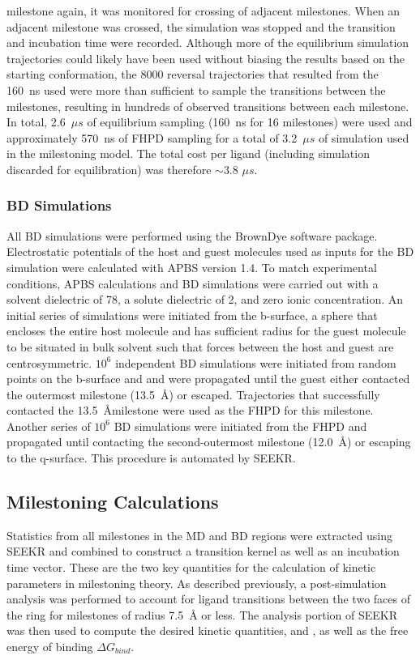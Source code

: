 milestone again, it was monitored for crossing of adjacent milestones.
When an adjacent milestone was crossed, the simulation was stopped and the
transition and incubation time were recorded. Although more of the equilibrium
simulation trajectories could likely have been used without biasing the results
based on the starting conformation, the 8000 reversal trajectories that resulted
from the 160~ns used were more than sufficient to sample the transitions between
the milestones, resulting in hundreds of observed transitions between each milestone.
In total, 2.6~${\mu}s$ of equilibrium sampling (160~ns for 16 milestones) were
used and approximately 570~ns of FHPD sampling for a total of 3.2~${\mu}s$ of
simulation used in the milestoning model. The total cost per ligand (including
simulation discarded for equilibration) was therefore $\sim$3.8 ${\mu}s$.

\subsubsection*{BD Simulations}
\par All BD simulations were performed using the BrownDye software package\cite{Huber2010}.
Electrostatic potentials of the host and guest molecules used as inputs for the
BD simulation were calculated with APBS version 1.4\cite{Baker2001}. To match
experimental conditions, APBS calculations and BD simulations were carried out
with a solvent dielectric of 78, a solute dielectric of 2, and zero ionic concentration.
An initial series of simulations were initiated from the b-surface, a sphere that
encloses the entire host molecule and has sufficient radius for the guest molecule
to be situated in bulk solvent such that forces between the host and guest are centrosymmetric.
$10^6$ independent BD simulations were initiated from random points on the b-surface
and and were propagated until the guest either contacted the outermost milestone
(13.5~\AA) or escaped. Trajectories that successfully contacted the 13.5~\AA milestone
were used as the FHPD for this milestone. Another series of $10^6$ BD simulations
were initiated from the FHPD and propagated until contacting the second-outermost
milestone (12.0~\AA) or escaping to the q-surface. This procedure is automated by
SEEKR.

\subsection*{Milestoning Calculations}
\par Statistics from all milestones in the MD and BD regions were extracted
using SEEKR and combined to construct a transition kernel as well as an incubation
time vector. These are the two key quantities for the calculation of kinetic
parameters in milestoning theory.\cite{Faradjian2004} As described previously,
a post-simulation analysis was performed to account for ligand transitions
between the two faces of the \bcd ring for milestones of radius 7.5~\AA
or less. The analysis portion of SEEKR was then used to compute the desired
kinetic quantities, \kon and \koff, as well as the free energy of binding $\Delta G_{bind}$.

